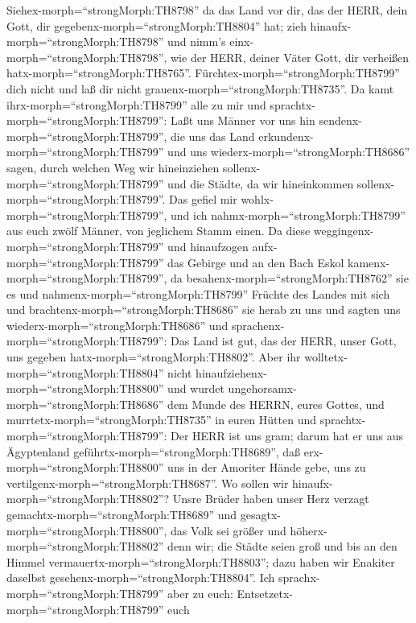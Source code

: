  Siehex-morph=``strongMorph:TH8798'' da das Land vor dir,
das der HERR, dein Gott, dir gegebenx-morph=``strongMorph:TH8804'' hat;
zieh hinaufx-morph=``strongMorph:TH8798'' und nimm's
einx-morph=``strongMorph:TH8798'', wie der HERR, deiner Väter Gott, dir
verheißen hatx-morph=``strongMorph:TH8765''.
Fürchtex-morph=``strongMorph:TH8799'' dich nicht und laß dir nicht
grauenx-morph=``strongMorph:TH8735''.  Da kamt
ihrx-morph=``strongMorph:TH8799'' alle zu mir und
sprachtx-morph=``strongMorph:TH8799'': Laßt uns Männer vor uns hin
sendenx-morph=``strongMorph:TH8799'', die uns das Land
erkundenx-morph=``strongMorph:TH8799'' und uns
wiederx-morph=``strongMorph:TH8686'' sagen, durch welchen Weg wir
hineinziehen sollenx-morph=``strongMorph:TH8799'' und die Städte, da wir
hineinkommen sollenx-morph=``strongMorph:TH8799''.  Das
gefiel mir wohlx-morph=``strongMorph:TH8799'', und ich
nahmx-morph=``strongMorph:TH8799'' aus euch zwölf Männer, von jeglichem
Stamm einen.  Da diese
weggingenx-morph=``strongMorph:TH8799'' und hinaufzogen
aufx-morph=``strongMorph:TH8799'' das Gebirge und an den Bach Eskol
kamenx-morph=``strongMorph:TH8799'', da
besahenx-morph=``strongMorph:TH8762'' sie es  und
nahmenx-morph=``strongMorph:TH8799'' Früchte des Landes mit sich und
brachtenx-morph=``strongMorph:TH8686'' sie herab zu uns und sagten uns
wiederx-morph=``strongMorph:TH8686'' und
sprachenx-morph=``strongMorph:TH8799'': Das Land ist gut, das der HERR,
unser Gott, uns gegeben hatx-morph=``strongMorph:TH8802''. 
Aber ihr wolltetx-morph=``strongMorph:TH8804'' nicht
hinaufziehenx-morph=``strongMorph:TH8800'' und wurdet
ungehorsamx-morph=``strongMorph:TH8686'' dem Munde des HERRN, eures
Gottes,  und murrtetx-morph=``strongMorph:TH8735'' in euren
Hütten und sprachtx-morph=``strongMorph:TH8799'': Der HERR ist uns gram;
darum hat er uns aus Ägyptenland geführtx-morph=``strongMorph:TH8689'',
daß erx-morph=``strongMorph:TH8800'' uns in der Amoriter Hände gebe, uns
zu vertilgenx-morph=``strongMorph:TH8687''.  Wo sollen wir
hinaufx-morph=``strongMorph:TH8802''? Unsre Brüder haben unser Herz
verzagt gemachtx-morph=``strongMorph:TH8689'' und
gesagtx-morph=``strongMorph:TH8800'', das Volk sei größer und
höherx-morph=``strongMorph:TH8802'' denn wir; die Städte seien groß und
bis an den Himmel vermauertx-morph=``strongMorph:TH8803''; dazu haben
wir Enakiter daselbst gesehenx-morph=``strongMorph:TH8804''.
 Ich sprachx-morph=``strongMorph:TH8799'' aber zu euch:
Entsetzetx-morph=``strongMorph:TH8799'' euch
